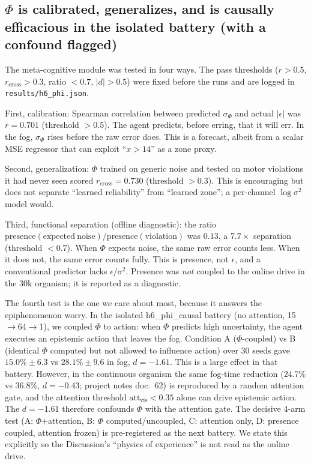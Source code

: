 \documentclass[11pt,a4paper]{article}
\begin{document}
\subsection{\texorpdfstring{$\Phi$}{Phi} is calibrated, generalizes, and is causally efficacious in the isolated battery (with a confound flagged)}

The meta-cognitive module was tested in four ways. The pass thresholds ($r>0.5$, $r_{\mathrm{cross}}>0.3$, ratio $<0.7$, $|d|>0.5$) were fixed before the runs and are logged in \texttt{results/h6\_phi.json}.

First, calibration: Spearman correlation between predicted $\sigma_\Phi$ and actual $|\epsilon|$ was $r=0.701$ (threshold $>0.5$). The agent predicts, before erring, that it will err. In the fog, $\sigma_\Phi$ rises before the raw error does. This is a forecast, albeit from a scalar MSE regressor that can exploit ``$x>14$'' as a zone proxy.

Second, generalization: $\Phi$ trained on generic noise and tested on motor violations it had never seen scored $r_{\mathrm{cross}}=0.730$ (threshold $>0.3$). This is encouraging but does not separate ``learned reliability'' from ``learned zone''; a per-channel $\log \sigma^2$ model would.

Third, functional separation (offline diagnostic): the ratio $\mathrm{presence}(\mathrm{expected\ noise})/\mathrm{presence}(\mathrm{violation})$ was $0.13$, a $7.7\times$ separation (threshold $<0.7$). When $\Phi$ expects noise, the same raw error counts less. When it does not, the same error counts fully. This is presence, not $\epsilon$, and a conventional predictor lacks $\epsilon/\sigma^2$. Presence was \textit{not} coupled to the online drive in the 30k organism; it is reported as a diagnostic.

The fourth test is the one we care about most, because it answers the epiphenomenon worry. In the isolated h6\_phi\_causal battery (no attention, 15$\rightarrow$64$\rightarrow$1), we coupled $\Phi$ to action: when $\Phi$ predicts high uncertainty, the agent executes an epistemic action that leaves the fog. Condition A ($\Phi$-coupled) vs B (identical $\Phi$ computed but not allowed to influence action) over 30 seeds gave $15.0\%\pm6.3$ vs $28.1\%\pm9.6$ in fog, $d=-1.61$. This is a large effect in that battery. However, in the continuous organism the same fog-time reduction ($24.7\%$ vs $36.8\%$, $d=-0.43$; project notes doc.~62) is reproduced by a random attention gate, and the attention threshold $\mathrm{att}_{\mathrm{vis}}<0.35$ alone can drive epistemic action. The $d=-1.61$ therefore confounds $\Phi$ with the attention gate. The decisive 4-arm test (A: $\Phi$+attention, B: $\Phi$ computed/uncoupled, C: attention only, D: presence coupled, attention frozen) is pre-registered as the next battery. We state this explicitly so the Discussion's ``physics of experience'' is not read as the online drive.
\end{document}
